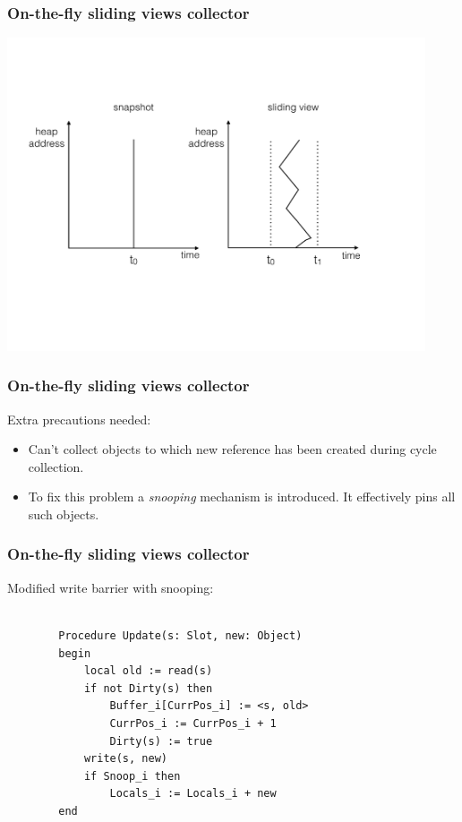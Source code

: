 \begin{frame}
    \frametitle{On-the-fly sliding views collector}
    \includegraphics[width=350pt]{snapshot_sliding.pdf}
\end{frame}

\begin{frame}
    \frametitle{On-the-fly sliding views collector}
    Extra precautions needed:
    \begin{itemize}
        \item Can't collect objects to which new reference
              has been created during cycle collection.
        \item To fix this problem a \textit{snooping} mechanism is
              introduced. It effectively pins all such objects.
    \end{itemize}
\end{frame}

\begin{frame}[fragile]
    \frametitle{On-the-fly sliding views collector}
    Modified write barrier with snooping:
    \begin{verbatim}

        Procedure Update(s: Slot, new: Object)
        begin
            local old := read(s)
            if not Dirty(s) then
                Buffer_i[CurrPos_i] := <s, old>
                CurrPos_i := CurrPos_i + 1
                Dirty(s) := true
            write(s, new)
            if Snoop_i then
                Locals_i := Locals_i + new
        end
    \end{verbatim}
\end{frame}

